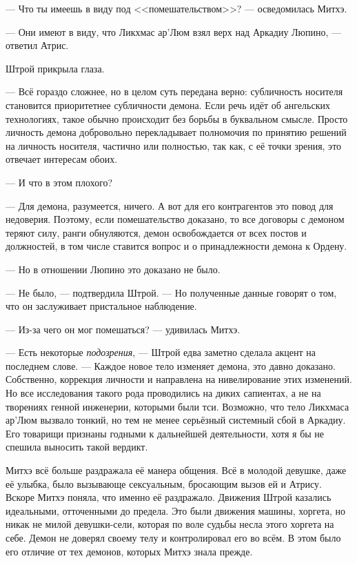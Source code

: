 --- Что ты имеешь в виду под <<помешательством>>? --- осведомилась Митхэ.

--- Они имеют в виду, что Ликхмас ар'Люм взял верх над Аркадиу Люпино, --- ответил Атрис.

Штрой прикрыла глаза.

--- Всё гораздо сложнее, но в целом суть передана верно: субличность носителя становится приоритетнее субличности демона.
Если речь идёт об ангельских технологиях, такое обычно происходит без борьбы в буквальном смысле.
Просто личность демона добровольно перекладывает полномочия по принятию решений на личность носителя, частично или полностью, так как, с её точки зрения, это отвечает интересам обоих.

--- И что в этом плохого?

--- Для демона, разумеется, ничего.
А вот для его контрагентов это повод для недоверия.
Поэтому, если помешательство доказано, то все договоры с демоном теряют силу, ранги обнуляются, демон освобождается от всех постов и должностей, в том числе ставится вопрос и о принадлежности демона к Ордену.

--- Но в отношении Люпино это доказано не было.

--- Не было, --- подтвердила Штрой.
--- Но полученные данные говорят о том, что он заслуживает пристальное наблюдение.

--- Из-за чего он мог помешаться? --- удивилась Митхэ.

--- Есть некоторые \emph{подозрения}, --- Штрой едва заметно сделала акцент на последнем слове.
--- Каждое новое тело изменяет демона, это давно доказано.
Собственно, коррекция личности и направлена на нивелирование этих изменений.
Но все исследования такого рода проводились на диких сапиентах, а не на творениях генной инженерии, которыми были тси.
Возможно, что тело Ликхмаса ар’Люм вызвало тонкий, но тем не менее серьёзный системный сбой в Аркадиу.
Его товарищи признаны годными к дальнейшей деятельности, хотя я бы не спешила выносить такой вердикт.

Митхэ всё больше раздражала её манера общения.
Всё в молодой девушке, даже её улыбка, было вызывающе сексуальным, бросающим вызов ей и Атрису.
Вскоре Митхэ поняла, что именно её раздражало.
Движения Штрой казались идеальными, отточенными до предела.
Это были движения машины, хоргета, но никак не милой девушки-сели, которая по воле судьбы несла этого хоргета на себе.
Демон не доверял своему телу и контролировал его во всём.
В этом было его отличие от тех демонов, которых Митхэ знала прежде.

